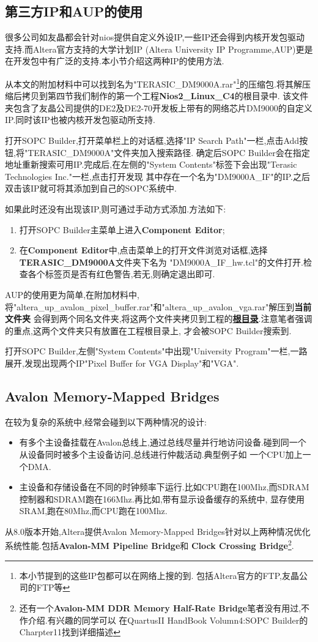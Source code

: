 \documentclass[12pt,a4paper,titlepage]{article}
\begin{document}
\subsection{第三方IP和AUP的使用}
很多公司如友晶都会针对nios提供自定义外设IP,一些IP还会得到内核开发包驱动支持.而Altera官方支持的大学计划IP
(Altera University IP Programme,AUP)更是在开发包中有广泛的支持.本小节介绍这两种IP的使用方法.

从本文的附加材料中可以找到名为"TERASIC\_DM9000A.rar"\footnote{本小节提到的这些IP包都可以在网络上搜的到.
包括Altera官方的FTP,友晶公司的FTP等}的压缩包.将其解压缩后拷贝到第四节我们制作的第一个工程\textbf{Nios2\_Linux\_C4}的根目录中.
该文件夹包含了友晶公司提供的DE2及DE2-70开发板上带有的网络芯片DM9000的自定义IP.同时该IP也被内核开发包驱动所支持.

打开SOPC Builder,打开菜单栏上的对话框,选择"IP Search Path"一栏,点击Add按钮,将"TERASIC\_DM9000A"文件夹加入搜索路径.
确定后SOPC Builder会在指定地址重新搜索可用IP.完成后,在左侧的"System Contents"标签下会出现"Terasic Technologies Inc."一栏,点击打开发现
其中存在一个名为"DM9000A\_IF"的IP.之后双击该IP就可将其添加到自己的SOPC系统中.

如果此时还没有出现该IP,则可通过手动方式添加.方法如下:
\begin{enumerate}
\item 打开SOPC Builder主菜单上进入\textbf{Component Editor};
\item 在\textbf{Component Editor}中,点击菜单上的打开文件浏览对话框,选择\textbf{TERASIC\_DM9000A}文件夹下名为
"DM9000A\_IF\_hw.tcl"的文件打开.检查各个标签页是否有红色警告,若无,则确定退出即可.
\end{enumerate}

AUP的使用更为简单,在附加材料中,将"altera\_up\_avalon\_pixel\_buffer.rar"和"altera\_up\_avalon\_vga.rar"解压到\textbf{当前文件夹}
会得到两个同名文件夹,将这两个文件夹拷贝到工程的\underline{\textbf{根目录}}.注意笔者强调的重点,这两个文件夹只有放置在工程根目录上,
才会被SOPC Builder搜索到.

打开SOPC Builder,左侧"System Contents"中出现"University Program"一栏,一路展开,发现出现两个IP"Pixel Buffer for VGA Display"和"VGA".
\subsection{Avalon Memory-Mapped Bridges}
在较为复杂的系统中,经常会碰到以下两种情况的设计:
\begin{itemize}
\item 有多个主设备挂载在Avalon总线上,通过总线尽量并行地访问设备.碰到同一个从设备同时被多个主设备访问,总线进行仲裁活动.典型例子如
一个CPU加上一个DMA.
\item 主设备和存储设备在不同的时钟频率下运行.比如CPU跑在100Mhz,而SDRAM控制器和SDRAM跑在166Mhz.再比如,带有显示设备缓存的系统中,
显存使用SRAM,跑在80Mhz,而CPU跑在100Mhz.
\end{itemize}
从8.0版本开始,Altera提供Avalon Memory-Mapped Bridges针对以上两种情况优化系统性能.包括\textbf{Avalon-MM Pipeline Bridge}和
\textbf{Clock Crossing Bridge}\footnote{还有一个\textbf{Avalon-MM DDR Memory Half-Rate Bridge}笔者没有用过,不作介绍.有兴趣的同学可以
在QuartusII HandBook Volumn4:SOPC Builder的Charpter11找到详细描述}.
\end{document}
